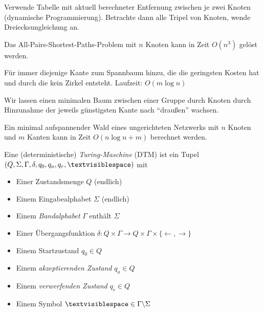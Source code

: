 \documentclass{cheat-sheet}
\begin{document}

\begin{alg}
  Verwende Tabelle mit aktuell berechneter Entfernung zwischen je zwei Knoten (dynamische Programmierung). Betrachte dann alle Tripel von Knoten, wende Dreiecksungleichung an.
\end{alg}

\begin{satz}
  Das All-Pairs-Shortest-Paths-Problem mit $n$ Knoten kann in Zeit $O(n^3)$ gelöst werden.
\end{satz}




\begin{alg}[Kruskal]
  Für immer diejenige Kante zum Spannbaum hinzu, die die geringsten Kosten hat und durch die kein Zirkel entsteht. Laufzeit: $O(m \log n)$
\end{alg}


\begin{alg}[Prim]
  Wir lassen einen minimalen Baum zwischen einer Gruppe durch Knoten durch Hinzunahme der jeweils günstigsten Kante nach "`draußen"' wachsen.
\end{alg}

\begin{satz}
  Ein minimal aufspannender Wald eines ungerichteten Netzwerks mit $n$ Knoten und $m$ Kanten kann in Zeit $O(n \log n + m)$ berechnet werden.
\end{satz}



\begin{defn}
  Eine (deterministische) \emph{Turing-Maschine} (DTM) ist ein Tupel $(Q, \Sigma, \Gamma, \delta, q_{0}, q_{a}, q_{r}, \textvisiblespace)$ mit

  \begin{itemize}{\leftmargin=0em}
    \setlength{\leftmargin}{0pt}
    \item Einer Zustandsmenge $Q$ (endlich)
    \item Einem Eingabealphabet $\Sigma$ (endlich)
    \item Einem \emph{Bandalphabet} $\Gamma$ enthält $\Sigma$
    \item Einer Übergangsfunktion $\delta : Q \times \Gamma \to Q \times \Gamma \times \{ \leftarrow, \rightarrow \} $
    \item Einem Startzustand $q_{0} \in Q$
    \item Einem \emph{akzeptierenden Zustand} $q_{a} \in Q$
    \item Einem \emph{verwerfenden Zustand} $q_{r} \in Q$
    \item Einem Symbol $\textvisiblespace \in \Gamma \backslash \Sigma$
  \end{itemize}
\end{defn}
\end{document}
